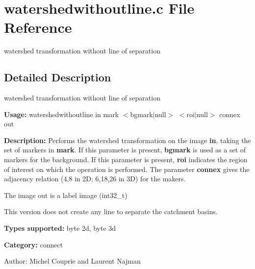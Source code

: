 \section{watershedwithoutline.c File Reference}
\label{watershedwithoutline_8c}
watershed transformation without line of separation 



\subsection{Detailed Description}
watershed transformation without line of separation 

{\bf Usage:} watershedwithoutline in mark $<$bgmark$|$null$>$ $<$roi$|$null$>$ connex out

{\bf Description:} Performs the watershed transformation on the image {\bf in}, taking the set of markers in {\bf mark}. If this parameter is present, {\bf bgmark} is used as a set of markers for the background. If this parameter is present, {\bf roi} indicates the region of interest on which the operation is performed. The parameter {\bf connex} gives the adjacency relation (4,8 in 2D; 6,18,26 in 3D) for the makers.

The image out is a label image (int32\_\-t)

This version does not create any line to separate the catchment basins.

{\bf Types supported:} byte 2d, byte 3d

{\bf Category:} connect

\begin{Desc}
\item[Author:]Michel Couprie and Laurent Najman \end{Desc}
